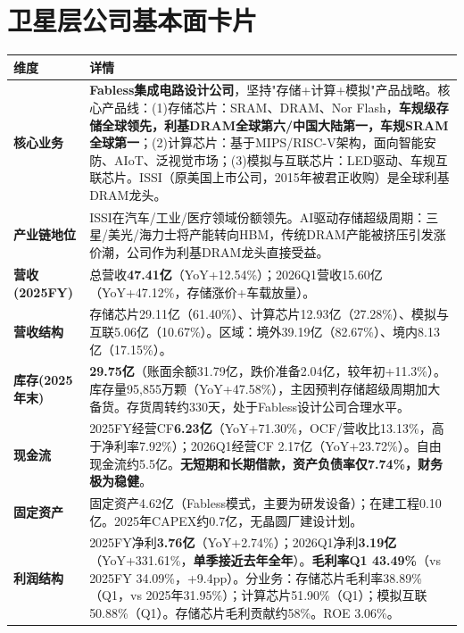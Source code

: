 \section{卫星层公司基本面卡片}

\begin{exhibitbox}
\centering
\scriptsize
\renewcommand{\arraystretch}{1.20}
\begin{tabularx}{\exhibitboxwidth}{>{\bfseries}p{2.2cm} >{\raggedright\arraybackslash\sloppy\hspace{0pt}}X}
\toprule
\textbf{维度} & \textbf{详情} \\
\midrule
核心业务 & \textbf{Fabless集成电路设计公司}，坚持"存储+计算+模拟"产品战略。核心产品线：(1)存储芯片：SRAM、DRAM、Nor Flash，\textbf{车规级存储全球领先，利基DRAM全球第六/中国大陆第一，车规SRAM全球第一}；(2)计算芯片：基于MIPS/RISC-V架构，面向智能安防、AIoT、泛视觉市场；(3)模拟与互联芯片：LED驱动、车规互联芯片。ISSI（原美国上市公司，2015年被君正收购）是全球利基DRAM龙头。 \\
产业链地位 & ISSI在汽车/工业/医疗领域份额领先。AI驱动存储超级周期：三星/美光/海力士将产能转向HBM，传统DRAM产能被挤压引发涨价潮，公司作为利基DRAM龙头直接受益。 \\
营收(2025FY) & 总营收\textbf{47.41亿}（YoY+12.54\%）；2026Q1营收15.60亿（YoY+47.12\%，存储涨价+车载放量）。 \\
营收结构 & 存储芯片29.11亿（61.40\%）、计算芯片12.93亿（27.28\%）、模拟与互联5.06亿（10.67\%）。区域：境外39.19亿（82.67\%）、境内8.13亿（17.15\%）。 \\
库存(2025年末) & \textbf{29.75亿}（账面余额31.79亿，跌价准备2.04亿，较年初+11.3\%）。库存量95,855万颗（YoY+47.58\%），主因预判存储超级周期加大备货。存货周转约330天，处于Fabless设计公司合理水平。 \\
现金流 & 2025FY经营CF\textbf{6.23亿}（YoY+71.30\%，OCF/营收比13.13\%，高于净利率7.92\%）；2026Q1经营CF 2.17亿（YoY+23.72\%）。自由现金流约5.5亿。\textbf{无短期和长期借款，资产负债率仅7.74\%，财务极为稳健}。 \\
固定资产 & 固定资产4.62亿（Fabless模式，主要为研发设备）；在建工程0.10亿。2025年CAPEX约0.7亿，无晶圆厂建设计划。 \\
利润结构 & 2025FY净利\textbf{3.76亿}（YoY+2.74\%）；2026Q1净利\textbf{3.19亿}（YoY+331.61\%，\textbf{单季接近去年全年}）。\textbf{毛利率Q1 43.49\%}（vs 2025FY 34.09\%，+9.4pp）。分业务：存储芯片毛利率38.89\%（Q1，vs 2025年31.95\%）；计算芯片51.90\%（Q1）；模拟互联50.88\%（Q1）。存储芯片毛利贡献约58\%。ROE 3.06\%。 \\

\end{tabularx}
\end{exhibitbox}
